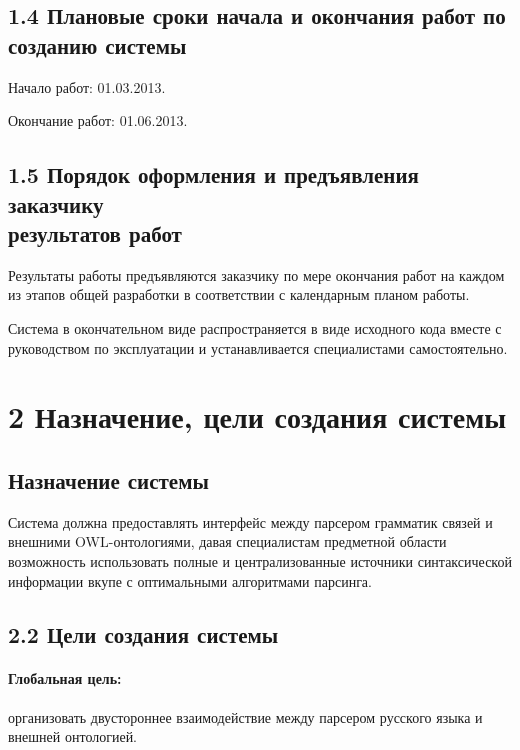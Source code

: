 \subsection*{1.4 Плановые сроки начала и окончания работ по\\ созданию системы}
Начало работ: 01.03.2013.

Окончание работ: 01.06.2013.

\subsection*{1.5 Порядок оформления и предъявления заказчику\\ результатов работ}
Результаты работы предъявляются заказчику по мере окончания работ на каждом из этапов общей разработки
в соответствии с календарным планом работы.

Система в окончательном виде распространяется в виде исходного кода вместе с руководством по эксплуатации и устанавливается специалистами самостоятельно.

\section*{2 Назначение, цели создания системы}
\subsection*{Назначение системы}
Система должна предоставлять интерфейс между парсером грамматик связей и внешними OWL-онтологиями, давая специалистам предметной области возможность использовать полные и централизованные источники синтаксической информации вкупе с оптимальными алгоритмами парсинга.

\subsection*{2.2 Цели создания системы}
\paragraph{Глобальная цель:} организовать двустороннее взаимодействие между парсером русского языка и внешней онтологией.
